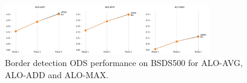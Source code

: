 
\begin{figure}%
  \centering
  \includegraphics[width=0.8\textwidth]{../imagens/visualiz_dados/bsds_experiment_2-1.png}
  \caption{Border detection ODS performance on BSDS500 for ALO-AVG, ALO-ADD and ALO-MAX.}
  \label{fig:bsds_subexp1_results}
\end{figure}

